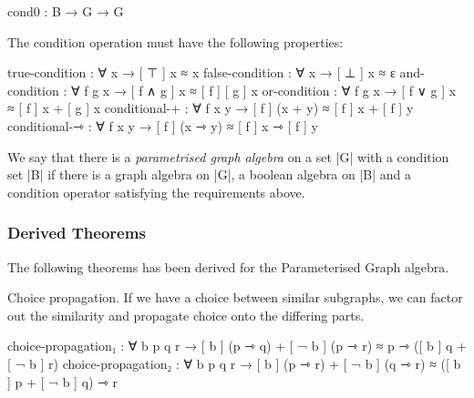 \begin{code}
cond0 : B → G → G
\end{code}

The condition operation must have the following properties:


\begin{code}
  true-condition : ∀ x → [ ⊤ ] x ≈ x
  false-condition : ∀ x → [ ⊥ ] x ≈ ε
  and-condition : ∀ f g x → [ f ∧ g ] x ≈ [ f ] [ g ]  x
  or-condition : ∀ f g x → [ f ∨ g ] x ≈ [ f ] x + [ g ]  x
  conditional-+ : ∀ f x y → [ f ] (x + y) ≈ [ f ] x + [ f ] y
  conditional-⇾ : ∀ f x y → [ f ] (x ⇾ y) ≈ [ f ] x ⇾ [ f ] y
\end{code}

We say that there is a \emph{parametrised graph algebra} on a set |G| with a condition set |B|
if there is a graph algebra on |G|, a boolean algebra on |B| and a condition operator satisfying the requirements above.

\subsubsection{Derived Theorems}

The following theorems has been derived for the Parameterised Graph algebra.


Choice propagation. If we have a choice between similar subgraphs, we can factor out the similarity and propagate choice onto the differing parts.
\begin{code}
choice-propagation₁ : ∀ b p q r → 
    [ b ] (p ⇾ q) + [ ¬ b ] (p ⇾ r) ≈ p ⇾ ([ b ] q + [ ¬ b ] r) 
choice-propagation₂ : ∀ b p q r → 
    [ b ] (p ⇾ r) + [ ¬ b ] (q ⇾ r) ≈ ([ b ] p + [ ¬ b ] q) ⇾ r
\end{code}


